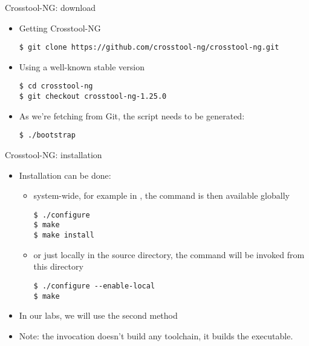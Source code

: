 \begin{frame}[fragile]{Crosstool-NG: download}
  \begin{itemize}
  \item Getting Crosstool-NG
\begin{verbatim}
$ git clone https://github.com/crosstool-ng/crosstool-ng.git
\end{verbatim}
  \item Using a well-known stable version
\begin{verbatim}
$ cd crosstool-ng
$ git checkout crosstool-ng-1.25.0
\end{verbatim}
  \item As we're fetching from Git, the  script needs
    to be generated:
\begin{verbatim}
$ ./bootstrap
\end{verbatim}
  \end{itemize}
\end{frame}

\begin{frame}[fragile]{Crosstool-NG: installation}
  \begin{itemize}
  \item Installation can be done:
    \begin{itemize}
    \item system-wide, for example in , the
       command is then available globally
\begin{verbatim}
$ ./configure
$ make
$ make install
\end{verbatim}
    \item or just locally in the source directory, the 
      command will be invoked from this directory
\begin{verbatim}
$ ./configure --enable-local
$ make
\end{verbatim}
    \end{itemize}
  \item In our labs, we will use the second method
  \item Note: the  invocation doesn't build any toolchain,
    it builds the  executable.
  \end{itemize}
\end{frame}

